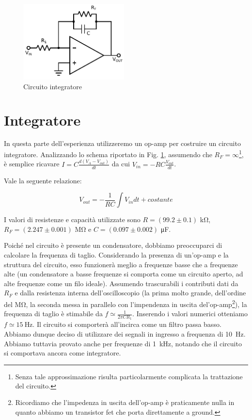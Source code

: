 \begin{figure}
	\includegraphics[width=55mm]{ccint.pdf}
	\caption{Circuito integratore}
	\label{fig:ccint}
\end{figure}

\section{Integratore}

In questa parte dell'esperienza utilizzeremo un op-amp per costruire un circuito integratore. Analizzando lo schema riportato in Fig. \ref{fig:ccint}, assumendo che $R_F=\infty$\footnote{Senza tale approssimazione risulta particolarmente complicata la trattazione del circuito.}, è semplice ricavare $I=C\frac{d(V_A-V_{out})}{dt}$ da cui $V_{in}=-RC\frac{V_{out}}{dt}$.

Vale la seguente relazione:%

\begin{equation}
V_{out}=-\frac{1}{RC} \int V_{in}dt +costante
\label{eq:int}
\end{equation}

I valori di resistenze e capacità utilizzate sono $R=(99.2 \pm 0.1)$ \si{\kilo\ohm},\\
$R_F=(2.247 \pm 0.001)$ \si{\mega\ohm} e $C=(0.097 \pm 0.002)$ \si{\micro\farad}. 

Poiché nel circuito è presente un condensatore, dobbiamo preoccuparci di calcolare la frequenza di taglio.
Considerando la presenza di un'op-amp e la struttura del circuito, esso funzionerà meglio a frequenze basse che a frequenze alte (un condensatore a basse frequenze si comporta come un circuito aperto, ad alte frequenze come un filo ideale).
Assumendo trascurabili i contributi dati da $R_F$ e dalla resistenza interna dell'oscilloscopio (la prima molto grande, dell'ordine del $\si{\mega\ohm}$, la seconda messa in parallelo con l'impendenza in uscita del'op-amp\footnote{Ricordiamo che l'impedenza in uscita dell'op-amp è praticamente nulla in quanto abbiamo un transistor fet che porta direttamente a ground.}), la frequenza di taglio è stimabile da $f\simeq \frac{1}{2\pi C R_1}$.
Inserendo i valori numerici otteniamo $f \simeq \SI{15}{\hertz}$.
Il circuito si comporterà all'incirca come un filtro passa basso.
Abbiamo dunque deciso di utilizzare dei segnali in ingresso a frequenza di \SI{10}{\hertz}.
Abbiamo tuttavia provato anche per frequenze di \SI{1}{\kilo\hertz}, notando che il circuito si comportava ancora come integratore.

